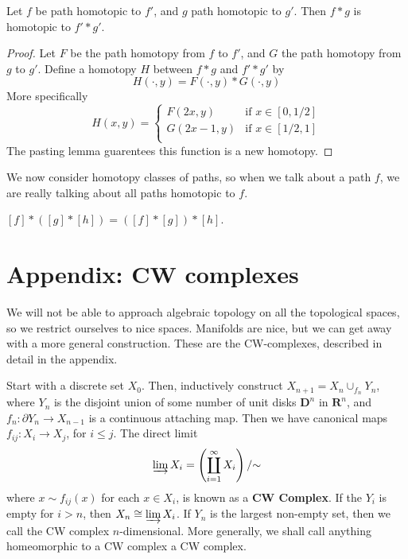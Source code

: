 \begin{theorem}
    Let $f$ be path homotopic to $f'$, and $g$ path homotopic to $g'$. Then $f * g$ is homotopic to $f' * g'$.
\end{theorem}
\begin{proof}
    Let $F$ be the path homotopy from $f$ to $f'$, and $G$ the path homotopy from $g$ to $g'$. Define a homotopy $H$ between $f * g$ and $f' * g'$ by
    \[ H(\cdot,y) = F(\cdot, y) * G(\cdot, y) \]
    More specifically
    \[ H(x,y) = \begin{cases}
        F(2x,y) & \text{if } x \in [0,1/2]\\
        G(2x - 1,y) & \text{if } x \in [1/2,1]\\
\end{cases} \]
    The pasting lemma guarentees this function is a new homotopy.
\end{proof}

We now consider homotopy classes of paths, so when we talk about a path $f$, we are really talking about all paths homotopic to $f$.

\begin{theorem}
    $[f] * ([g] * [h]) = ([f] * [g]) * [h]$.
\end{theorem}








\chapter{Appendix: CW complexes}

We will not be able to approach algebraic topology on all the topological spaces, so we restrict ourselves to nice spaces. Manifolds are nice, but we can get away with a more general construction. These are the CW-complexes, described in detail in the appendix.

Start with a discrete set $X_0$. Then, inductively construct $X_{n+1} = X_n \cup_{f_n} Y_n$, where $Y_n$ is the disjoint union of some number of unit disks $\mathbf{D}^n$ in $\mathbf{R}^n$, and $f_n: \partial Y_n \to X_{n-1}$ is a continuous attaching map. Then we have canonical maps $f_{ij}: X_i \to X_j$, for $i \leq j$. The direct limit
%
\[ \varinjlim X_i = \left( \coprod_{i = 1}^\infty X_i \right) / {\sim} \]
%
where $x \sim f_{ij}(x)$ for each $x \in X_i$, is known as a {\bf CW Complex}. If the $Y_i$ is empty for $i > n$, then $X_n \cong \varinjlim X_i$. If $Y_n$ is the largest non-empty set, then we call the CW complex $n$-dimensional. More generally, we shall call anything homeomorphic to a CW complex a CW complex.

